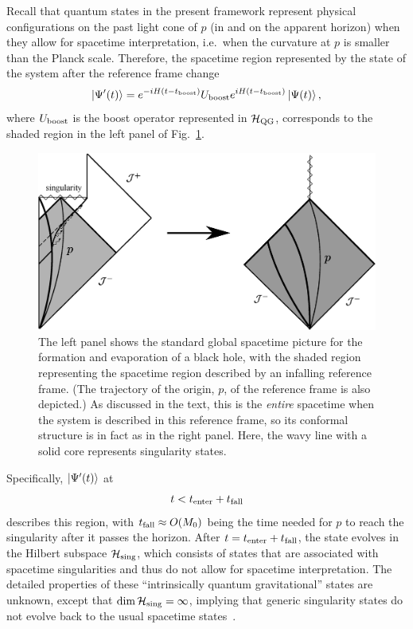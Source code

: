 \documentclass[12pt]{article}
\begin{document}
Recall that quantum states in the present framework represent physical 
configurations on the past light cone of $p$ (in and on the apparent 
horizon) when they allow for spacetime interpretation, i.e.\ when the 
curvature at $p$ is smaller than the Planck scale.  Therefore, the spacetime 
region represented by the state of the system after the reference frame 
change
%
\begin{equation}
  \ket{\Psi'(t)} = e^{-iH(t-t_{\rm boost})} U_{\rm boost} 
    e^{iH(t-t_{\rm boost})} \ket{\Psi(t)},
\label{eq:ref-change}
\end{equation}
%
where $U_{\rm boost}$ is the boost operator represented in 
${\cal H}_{\rm QG}$, corresponds to the shaded region in the left 
panel of Fig.~\ref{fig:Penrose-inside}.
%
\begin{figure}[t]
\begin{center}
  \includegraphics[width=12cm]{figure/Penrose-2.eps}
\caption{The left panel shows the standard global spacetime picture 
 for the formation and evaporation of a black hole, with the shaded 
 region representing the spacetime region described by an infalling 
 reference frame.  (The trajectory of the origin, $p$, of the reference 
 frame is also depicted.)  As discussed in the text, this is the 
 {\it entire} spacetime when the system is described in this reference 
 frame, so its conformal structure is in fact as in the right panel. 
 Here, the wavy line with a solid core represents singularity states.}
\label{fig:Penrose-inside}
\end{center}
\end{figure}
%
Specifically, $\left| \Psi'(t) \right>$ at
%
\begin{equation}
  t < t_{\rm enter} + t_{\rm fall}
\label{eq:spacetime}
\end{equation}
%
describes this region, with $t_{\rm fall} \approx O(M_0)$ being 
the time needed for $p$ to reach the singularity after it passes the 
horizon.  After $t = t_{\rm enter} + t_{\rm fall}$, the state evolves 
in the Hilbert subspace ${\cal H}_{\rm sing}$, which consists of 
states that are associated with spacetime singularities and thus do 
not allow for spacetime interpretation.  The detailed properties of 
these ``intrinsically quantum gravitational'' states are unknown, 
except that ${\rm dim}\, {\cal H}_{\rm sing} = \infty$, implying that 
generic singularity states do not evolve back to the usual spacetime 
states~\cite{Nomura:2011rb}.
\end{document}
